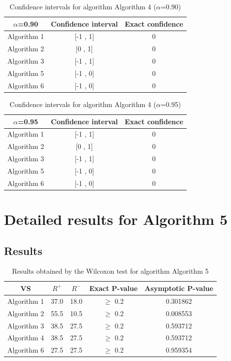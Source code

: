 \documentclass[a4paper,10pt]{article}
\begin{document}
\begin{table}[!htp]
\centering\small
\begin{tabular}{
|c|c|c|}
\hline
 $\alpha$=0.90 & Confidence interval & Exact confidence \\ \hline 
Algorithm 1 & [-1 , 1] & 0\\ \hline 
Algorithm 2 & [0 , 1] & 0\\ \hline 
Algorithm 3 & [-1 , 1] & 0\\ \hline 
Algorithm 5 & [-1 , 0] & 0\\ \hline 
Algorithm 6 & [-1 , 0] & 0\\ \hline 

\end{tabular}
\caption{Confidence intervals for algorithm Algorithm 4 ($\alpha$=0.90)}
\end{table}
\begin{table}[!htp]
\centering\small
\begin{tabular}{
|c|c|c|}
\hline
 $\alpha$=0.95 & Confidence interval & Exact confidence \\ \hline 
Algorithm 1 & [-1 , 1] & 0\\ \hline 
Algorithm 2 & [0 , 1] & 0\\ \hline 
Algorithm 3 & [-1 , 1] & 0\\ \hline 
Algorithm 5 & [-1 , 0] & 0\\ \hline 
Algorithm 6 & [-1 , 0] & 0\\ \hline 

\end{tabular}
\caption{Confidence intervals for algorithm Algorithm 4 ($\alpha$=0.95)}
\end{table}

 \clearpage 


\section{Detailed results for Algorithm 5}


\subsection{Results}

\begin{table}[!htp]
\centering\small
\begin{tabular}{
|c|c|c|c|c|}
\hline
 VS & $R^{+}$ & $R^{-}$ & Exact P-value & Asymptotic P-value \\ \hline 
Algorithm 1 & 37.0 & 18.0 & $\geq$ 0.2 & 0.301862\\ \hline 
Algorithm 2 & 55.5 & 10.5 & $\geq$ 0.2 & 0.008553\\ \hline 
Algorithm 3 & 38.5 & 27.5 & $\geq$ 0.2 & 0.593712\\ \hline 
Algorithm 4 & 38.5 & 27.5 & $\geq$ 0.2 & 0.593712\\ \hline 
Algorithm 6 & 27.5 & 27.5 & $\geq$ 0.2 & 0.959354\\ \hline 

\end{tabular}
\caption{Results obtained by the Wilcoxon test for algorithm Algorithm 5}
\end{table}
\end{document}
